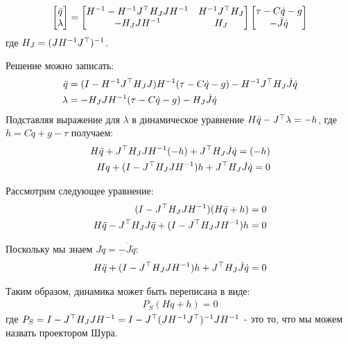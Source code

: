 \begin{equation}
	\begin{bmatrix}
		\ddot{{q}} \\
		\lambda
	\end{bmatrix}
	=
	\begin{bmatrix}
		{H}^{-1}-{H}^{-1} {J}^\top {H}_J {J} {H}^{-1} &
		{H}^{-1} {J}^\top {H}_J \\
		-{H}_J {J} {H}^{-1} & {H}_J
	\end{bmatrix}
	\begin{bmatrix}
		\tau - {C} \dot{{q}} - {g} \\
		-\dot{{J}} \dot{{q}}
	\end{bmatrix}
\end{equation}
%
где ${H}_J = ( {J} {H}^{-1} {J}^\top )^{-1}$.

Решение можно записать:
%
\begin{align}
	\ddot{{q}}
	&=
	({I}-{H}^{-1} {J}^\top {H}_J {J} ) {H}^{-1}(\tau - {C} \dot{{q}} - {g}) 
	-
	{H}^{-1} {J}^\top {H}_J \dot{{J}} \dot{{q}}
	\\
	\lambda
	&=
	-{H}_J {J} {H}^{-1} (\tau - {C} \dot{{q}} - {g})
	-
	{H}_J \dot{{J}} \dot{{q}}
\end{align}
%
Подставляя выражение для $\lambda$ в динамическое уравнение ${H}\ddot{{q}} - {J}^\top\lambda
=
-{h}$, где ${h} = {C} \dot{{q}} + {g} - \tau$ получаем:
\begin{align}
	{H}\ddot{{q}} + 
	{J}^\top{H}_J {J} {H}^{-1} (-{h}) +
	{J}^\top {H}_J \dot{{J}} \dot{{q}}
	=
	(-{h})
	\\
	{{H}{{q}} + 
		({I}-
		{J}^\top{H}_J {J} {H}^{-1}) {h} +
		{J}^\top {H}_J \dot{{J}} \dot{{q}}
		=
		0}
\end{align}

Рассмотрим следующее уравнение:
%
\begin{align}
	({I}-
	{J}^\top{H}_J {J} {H}^{-1})({H}\ddot{{q}}+{h})=0
	\\
	{H}\ddot{{q}} - {J}^\top{H}_J {J} \ddot{{q}}
	+
	({I}-
	{J}^\top{H}_J {J} {H}^{-1}){h} = 0
\end{align}

Поскольку мы знаем ${J} \ddot{{q}} = -\dot{{J}} \dot{{q}}$:
%
\begin{align}{
		{H}\ddot{{q}} + ({I}-{J}^\top{H}_J {J} {H}^{-1}){h} + {J}^\top{H}_J \dot{{J}} \dot{{q}} = 0}
\end{align}

Таким образом, динамика может быть переписана в виде: 
%
\begin{align}
	{P}_S({H}\ddot{{q}}+{h})=0
\end{align}
%
где ${P}_S = {I}-{J}^\top{H}_J {J} {H}^{-1} = 
{I}-{J}^\top ( {J} {H}^{-1} {J}^\top )^{-1} {J} {H}^{-1}$ - это то, что мы можем назвать проектором Шура.

